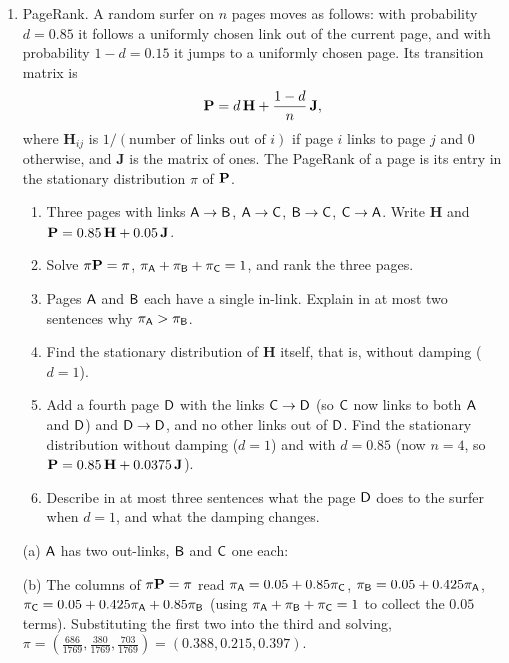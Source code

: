 \begin{enumerate}[resume*=quiz]
\item PageRank. A random surfer on $n$ pages moves as follows: with probability $d=0.85$ it follows a uniformly chosen link out of the current page, and with probability $1-d=0.15$ it jumps to a uniformly chosen page. Its transition matrix is
\[
\mathbf{P}=d\,\mathbf H+\frac{1-d}{n}\,\mathbf J,
\]
where $\mathbf H_{ij}$ is $1/(\text{number of links out of }i)$ if page $i$ links to page $j$ and $0$ otherwise, and $\mathbf J$ is the matrix of ones. The PageRank of a page is its entry in the stationary distribution $\pi$ of $\mathbf{P}$.
\begin{enumerate}[label=(\alph*),leftmargin=2em]
\item Three pages with links $\mathsf{A}\to\mathsf{B}$, $\mathsf{A}\to\mathsf{C}$, $\mathsf{B}\to\mathsf{C}$, $\mathsf{C}\to\mathsf{A}$. Write $\mathbf H$ and $\mathbf{P}=0.85\,\mathbf H+0.05\,\mathbf J$.
\item Solve $\pi\mathbf{P}=\pi$, $\pi_{\mathsf{A}}+\pi_{\mathsf{B}}+\pi_{\mathsf{C}}=1$, and rank the three pages.
\item Pages $\mathsf{A}$ and $\mathsf{B}$ each have a single in-link. Explain in at most two sentences why $\pi_{\mathsf{A}}>\pi_{\mathsf{B}}$.
\item Find the stationary distribution of $\mathbf H$ itself, that is, without damping ($d=1$).
\item Add a fourth page $\mathsf{D}$ with the links $\mathsf{C}\to\mathsf{D}$ (so $\mathsf{C}$ now links to both $\mathsf{A}$ and $\mathsf{D}$) and $\mathsf{D}\to\mathsf{D}$, and no other links out of $\mathsf{D}$. Find the stationary distribution without damping ($d=1$) and with $d=0.85$ (now $n=4$, so $\mathbf{P}=0.85\,\mathbf H+0.0375\,\mathbf J$).
\item Describe in at most three sentences what the page $\mathsf{D}$ does to the surfer when $d=1$, and what the damping changes.
\end{enumerate}
\begin{solution}
(a) $\mathsf{A}$ has two out-links, $\mathsf{B}$ and $\mathsf{C}$ one each:

(b) The columns of $\pi\mathbf{P}=\pi$ read
$\pi_{\mathsf{A}}=0.05+0.85\pi_{\mathsf{C}}$, $\pi_{\mathsf{B}}=0.05+0.425\pi_{\mathsf{A}}$, $\pi_{\mathsf{C}}=0.05+0.425\pi_{\mathsf{A}}+0.85\pi_{\mathsf{B}}$
(using $\pi_{\mathsf{A}}+\pi_{\mathsf{B}}+\pi_{\mathsf{C}}=1$ to collect the $0.05$ terms). Substituting the first two into the third and solving,
$\pi=(\tfrac{686}{1769},\tfrac{380}{1769},\tfrac{703}{1769})=(0.388,0.215,0.397)$.


\end{solution}
\end{enumerate}
